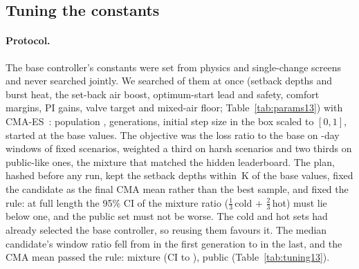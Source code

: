 \documentclass{article}
\begin{document}
\subsection{Tuning the constants}
\label{sec:tuning}

\paragraph{Protocol.} The base controller's constants were set from physics and single-change screens and never searched jointly. We searched \RTwNParams{} of them at once (setback depths and burst heat, the set-back air boost, optimum-start lead and safety, comfort margins, PI gains, valve target and mixed-air floor; Table~\ref{tab:params13}) with CMA-ES~\citep{hansen2016cma}: population \RTwPop, \RTwGens{} generations, initial step size \RTwSigmaZero{} in the box scaled to $[0,1]$, started at the base values. The objective was the loss ratio to the base on \RTwWinDays-day windows of \RTwNWin{} fixed scenarios, weighted a third on \RTwNWinHarsh{} harsh scenarios and two thirds on \RTwNWinPub{} public-like ones, the mixture that matched the hidden leaderboard. The plan, hashed before any run, kept the setback depths within \RTwDepthMaxDeeper\,K of the base values, fixed the candidate as the final CMA mean rather than the best sample, and fixed the rule: at full length the 95\% CI of the mixture ratio ($\tfrac13$\,cold $+$ $\tfrac23$\,hot) must lie below one, and the public set must not be worse. The cold and hot sets had already selected the base controller, so reusing them favours it. The median candidate's window ratio fell from \RTwMedFirst{} in the first generation to \RTwMedLast{} in the last, and the CMA mean passed the rule: mixture \RTwCandMix{} (CI \RTwCandMixLo{} to \RTwCandMixHi), public \RTwCandPub{} (Table~\ref{tab:tuning13}).
\end{document}
